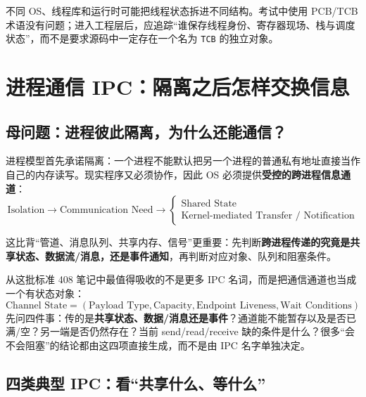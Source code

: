 \documentclass[11pt,a4paper]{ctexart}
\newcommand{\kw}[1]{\textbf{#1}}
\newcommand{\code}[1]{\texttt{#1}}
\begin{document}
\begin{warn}
不同 OS、线程库和运行时可能把线程状态拆进不同结构。考试中使用 PCB/TCB 术语没有问题；进入工程层后，应追踪“谁保存线程身份、寄存器现场、栈与调度状态”，而不是要求源码中一定存在一个名为 \code{TCB} 的独立对象。
\end{warn}

\section{进程通信 IPC：隔离之后怎样交换信息}

\subsection{母问题：进程彼此隔离，为什么还能通信？}

进程模型首先承诺隔离：一个进程不能默认把另一个进程的普通私有地址直接当作自己的内存读写。现实程序又必须协作，因此 OS 必须提供\kw{受控的跨进程信息通道}：
\[
\boxed{
\text{Isolation}
\rightarrow
\text{Communication Need}
\rightarrow
\left\{
\begin{array}{l}
\text{Shared State}\\
\text{Kernel-mediated Transfer / Notification}
\end{array}
\right.
}
\]

这比背“管道、消息队列、共享内存、信号”更重要：先判断\kw{跨进程传递的究竟是共享状态、数据流/消息，还是事件通知}，再判断对应对象、队列和阻塞条件。

\begin{corebox}
从这批标准 408 笔记中最值得吸收的不是更多 IPC 名词，而是把通信通道也当成一个有状态对象：
\[
\boxed{
\text{Channel State}
=
(\text{Payload Type},\text{Capacity},\text{Endpoint Liveness},\text{Wait Conditions})
}
\]
先问四件事：传的是\kw{共享状态、数据/消息还是事件}？通道能不能暂存以及是否已满/空？另一端是否仍然存在？当前 send/read/receive 缺的条件是什么？很多“会不会阻塞”的结论都由这四项直接生成，而不是由 IPC 名字单独决定。
\end{corebox}

\subsection{四类典型 IPC：看“共享什么、等什么”}
\end{document}
